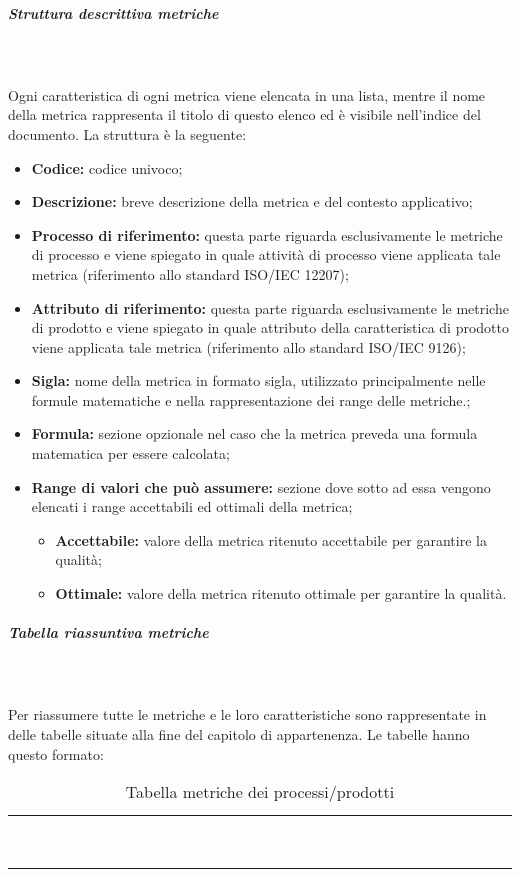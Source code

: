 \subparagraph{Struttura descrittiva metriche}\mbox{} \\ \\
Ogni caratteristica di ogni metrica viene elencata in una lista, mentre il nome della metrica rappresenta il titolo di questo elenco ed è visibile nell'indice del documento. La struttura è la seguente:
\begin{itemize}
    \item \textbf{Codice:} codice univoco;
    \item \textbf{Descrizione:} breve descrizione della metrica e del contesto applicativo;
    \item \textbf{Processo di riferimento:} questa parte riguarda esclusivamente le metriche di processo e viene spiegato in quale attività di processo viene applicata tale metrica (riferimento allo standard ISO/IEC 12207);
    \item \textbf{Attributo di riferimento:} questa parte riguarda esclusivamente le metriche di prodotto e viene spiegato in quale attributo della caratteristica di prodotto viene applicata tale metrica (riferimento allo standard ISO/IEC 9126);
    \item \textbf{Sigla:} nome della metrica in formato sigla, utilizzato principalmente nelle formule matematiche e nella rappresentazione dei range delle metriche.;
    \item \textbf{Formula:} sezione opzionale nel caso che la metrica preveda una formula matematica per essere calcolata;
    \item \textbf{Range di valori che può assumere:} sezione dove sotto ad essa vengono elencati i range accettabili ed ottimali della metrica;
    \begin{itemize}
        \item \textbf{Accettabile:} valore della metrica ritenuto accettabile per garantire la qualità;
        \item \textbf{Ottimale:} valore della metrica ritenuto ottimale per garantire la qualità.
    \end{itemize}
\end{itemize} 

\subparagraph{Tabella riassuntiva metriche}\mbox{} \\ \\
Per riassumere tutte le metriche e le loro caratteristiche sono rappresentate in delle tabelle situate alla fine del capitolo di appartenenza. Le tabelle hanno questo formato:

    \renewcommand{\arraystretch}{1.5}
    \begin{longtable}{ c C{4cm} c c c}
    \caption{Tabella metriche dei processi/prodotti}\\
    \textcolor{white}{\textbf{Metrica}} & \textcolor{white}{\textbf{Nome}} & \textcolor{white}{\textbf{Sigla}} & \textcolor{white}{\textbf{Valore Accettabile}} & \textcolor{white}{\textbf{Valore Ottimale}}\\
    \end{longtable}

